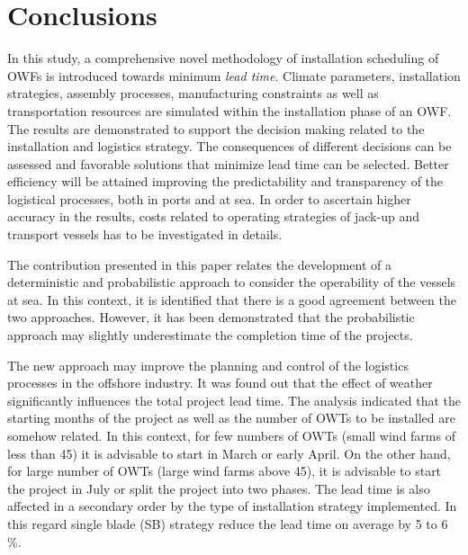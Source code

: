 \section{Conclusions}
\label{conclusions}


In this study, a comprehensive novel methodology of installation scheduling of OWFs is introduced towards minimum \textit{lead time}. Climate parameters, installation strategies, assembly processes, manufacturing constraints as well as transportation resources are simulated within the installation phase of an OWF. The results are demonstrated to support the decision making related to the installation and logistics strategy. The consequences of different decisions can be assessed and favorable solutions that minimize lead time can be selected. Better efficiency will be attained improving the predictability and transparency of the logistical processes, both in ports and at sea. In order to ascertain higher accuracy in the results, costs related to operating strategies of jack-up and transport vessels has to be investigated in details.

The contribution presented in this paper relates the development of a deterministic and probabilistic approach to consider the operability of the vessels at sea. In this context, it is identified that there is a good agreement between the two approaches. However, it has been demonstrated that the probabilistic approach may slightly underestimate the completion time of the projects.

The new approach may improve the planning and control of the logistics processes in the offshore industry. It was found out that the effect of weather significantly influences the total project lead time. The analysis indicated that the starting months of the project as well as the number of OWTs to be installed are somehow related. In this context, for few numbers of OWTs (small wind farms of less than 45) it is advisable to start in March or early April. On the other hand, for large number of OWTs (large wind farms above 45), it is advisable to start the project in July or split the project into two phases. The lead time is also affected in a secondary order by the type of installation strategy implemented. In this regard single blade (SB) strategy reduce the lead time on average by 5 to 6 \%.



